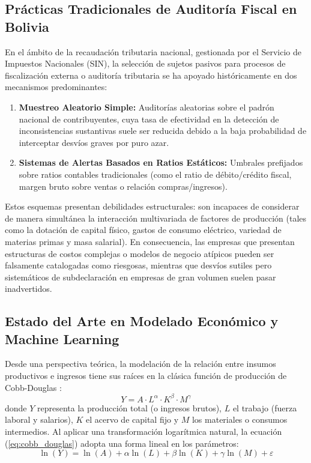 \subsection{Prácticas Tradicionales de Auditoría Fiscal en Bolivia}
En el ámbito de la recaudación tributaria nacional, gestionada por el Servicio de Impuestos Nacionales (SIN), la selección de sujetos pasivos para procesos de fiscalización externa o auditoría tributaria se ha apoyado históricamente en dos mecanismos predominantes:
\begin{enumerate}
    \item \textbf{Muestreo Aleatorio Simple:} Auditorías aleatorias sobre el padrón nacional de contribuyentes, cuya tasa de efectividad en la detección de inconsistencias sustantivas suele ser reducida debido a la baja probabilidad de interceptar desvíos graves por puro azar.
    \item \textbf{Sistemas de Alertas Basados en Ratios Estáticos:} Umbrales prefijados sobre ratios contables tradicionales (como el ratio de débito/crédito fiscal, margen bruto sobre ventas o relación compras/ingresos). 
\end{enumerate}

Estos esquemas presentan debilidades estructurales: son incapaces de considerar de manera simultánea la interacción multivariada de factores de producción (tales como la dotación de capital físico, gastos de consumo eléctrico, variedad de materias primas y masa salarial). En consecuencia, las empresas que presentan estructuras de costos complejas o modelos de negocio atípicos pueden ser falsamente catalogadas como riesgosas, mientras que desvíos sutiles pero sistemáticos de subdeclaración en empresas de gran volumen suelen pasar inadvertidos.

\subsection{Estado del Arte en Modelado Económico y Machine Learning}
Desde una perspectiva teórica, la modelación de la relación entre insumos productivos e ingresos tiene sus raíces en la clásica función de producción de Cobb-Douglas \citep{cobb1928theory}:
\begin{equation}
    Y = A \cdot L^\alpha \cdot K^\beta \cdot M^\gamma
    \label{eq:cobb_douglas}
\end{equation}
donde $Y$ representa la producción total (o ingresos brutos), $L$ el trabajo (fuerza laboral y salarios), $K$ el acervo de capital fijo y $M$ los materiales o consumos intermedios. Al aplicar una transformación logarítmica natural, la ecuación (\ref{eq:cobb_douglas}) adopta una forma lineal en los parámetros:
\begin{equation}
    \ln(Y) = \ln(A) + \alpha \ln(L) + \beta \ln(K) + \gamma \ln(M) + \varepsilon
    \label{eq:cobb_douglas_log}
\end{equation}

